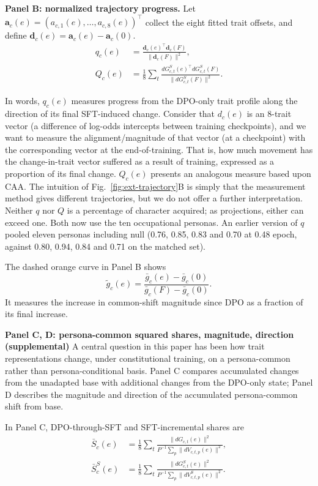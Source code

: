 \documentclass{article}
\begin{document}
\noindent\textbf{Panel B: normalized trajectory progress.}
Let $\mathbf a_c(e)=
(a_{c,1}(e),\ldots,a_{c,8}(e))^\top$
collect the eight fitted trait offsets, and define
$\mathbf d_c(e)=\mathbf a_c(e)-\mathbf a_c(0)$.
\begin{align}
q_c(e)
 &= \frac{\mathbf d_c(e)^\top\mathbf d_c(F)}
          {\|\mathbf d_c(F)\|^2}, \\
Q_c(e)
 &= \frac18\sum_t
    \frac{dG^{S}_{c,t}(e)^\top dG^{S}_{c,t}(F)}
         {\|dG^{S}_{c,t}(F)\|^2}.
\end{align}

In words, $q_c(e)$ measures progress from the DPO-only
trait profile along the direction of its final SFT-induced
change. Consider that $d_c(e)$ is an 8-trait vector (a difference of log-odds intercepts between training checkpoints), and we want to measure the alignment/magnitude of that vector (at a checkpoint) with the corresponding vector at the end-of-training. That is, how much movement has the change-in-trait vector suffered as a result of training, expressed as a proportion of its final change. $Q_c(e)$ presents an analogous measure based upon CAA. The intuition of Fig.~\ref{fig:ext-trajectory}B is simply that the measurement method gives different trajectories, but we do not offer a further interpretation. Neither $q$ nor $Q$ is a percentage of character acquired; as projections, either can exceed one. Both now use the ten occupational personas. An earlier version of $q$ pooled eleven personas including null (0.76, 0.85, 0.83 and 0.70 at 0.48 epoch, against 0.80, 0.94, 0.84 and 0.71 on the matched set).

The dashed orange curve in Panel B shows
\begin{equation}
\widetilde g_c(e)
 = \frac{\bar g_c(e)-\bar g_c(0)}
        {\bar g_c(F)-\bar g_c(0)}.
\end{equation}
It measures the increase in common-shift magnitude since DPO as a fraction of its final increase.

\noindent\textbf{Panel C, D: persona-common squared shares, magnitude, direction (supplemental)}
A central question in this paper has been how trait representations change, under constitutional training, on a persona-common rather than persona-conditional basis. Panel C compares accumulated changes from the unadapted base with additional changes from the DPO-only state; Panel D describes the magnitude and direction of the
accumulated persona-common shift from base.



In Panel C, DPO-through-SFT and SFT-incremental shares are
\begin{align}
\bar S_c(e)
 &= \frac18\sum_t
    \frac{\|dG_{c,t}(e)\|^2}
         {P^{-1}\sum_p\|dV_{c,t,p}(e)\|^2}, \\
\bar S^{S}_c(e)
 &= \frac18\sum_t
    \frac{\|dG^{S}_{c,t}(e)\|^2}
         {P^{-1}\sum_p\|dV^{S}_{c,t,p}(e)\|^2}.
\end{align}
\end{document}
